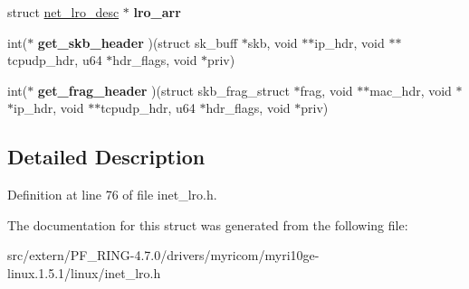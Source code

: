\begin{DoxyCompactItemize}
\item 
\hypertarget{structnet__lro__mgr_aa3afbfc917cd4b3688b8f5a4ca56a401}{
struct \hyperlink{structnet__lro__desc}{net\_\-lro\_\-desc} $\ast$ {\bfseries lro\_\-arr}}
\label{structnet__lro__mgr_aa3afbfc917cd4b3688b8f5a4ca56a401}

\item 
\hypertarget{structnet__lro__mgr_a5ca7021a929b021ddf526c49686e6151}{
int($\ast$ {\bfseries get\_\-skb\_\-header} )(struct sk\_\-buff $\ast$skb, void $\ast$$\ast$ip\_\-hdr, void $\ast$$\ast$tcpudp\_\-hdr, u64 $\ast$hdr\_\-flags, void $\ast$priv)}
\label{structnet__lro__mgr_a5ca7021a929b021ddf526c49686e6151}

\item 
\hypertarget{structnet__lro__mgr_a81092a974e50784f2725ff7a0503124c}{
int($\ast$ {\bfseries get\_\-frag\_\-header} )(struct skb\_\-frag\_\-struct $\ast$frag, void $\ast$$\ast$mac\_\-hdr, void $\ast$$\ast$ip\_\-hdr, void $\ast$$\ast$tcpudp\_\-hdr, u64 $\ast$hdr\_\-flags, void $\ast$priv)}
\label{structnet__lro__mgr_a81092a974e50784f2725ff7a0503124c}

\end{DoxyCompactItemize}


\subsection{Detailed Description}


Definition at line 76 of file inet\_\-lro.h.



The documentation for this struct was generated from the following file:\begin{DoxyCompactItemize}
\item 
src/extern/PF\_\-RING-\/4.7.0/drivers/myricom/myri10ge-\/linux.1.5.1/linux/inet\_\-lro.h\end{DoxyCompactItemize}
